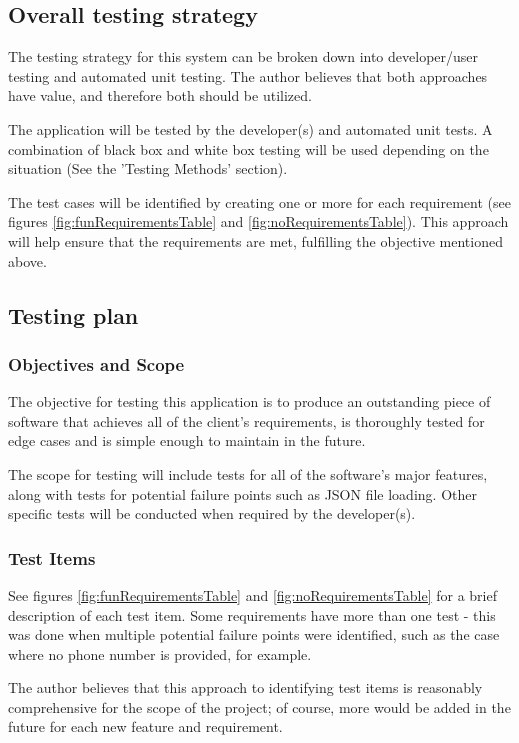 \documentclass[a4paper]{article}
\begin{document}
\subsection{Overall testing strategy}
The testing strategy for this system can be broken down into developer/user testing and automated unit testing. The author believes that both approaches have value, and therefore both should be utilized.

The application will be tested by the developer(s) and automated unit tests. A combination of black box and white box testing will be used depending on the situation (See the 'Testing Methods' section).

The test cases will be identified by creating one or more for each requirement (see figures \ref{fig:funRequirementsTable} and \ref{fig:noRequirementsTable}). This approach will help ensure that the requirements are met, fulfilling the objective mentioned above.

\subsection{Testing plan}

\subsubsection{Objectives and Scope}
The objective for testing this application is to produce an outstanding piece of software that achieves all of the client's requirements, is thoroughly tested for edge cases and is simple enough to maintain in the future.

The scope for testing will include tests for all of the software's major features, along with tests for potential failure points such as JSON file loading. Other specific tests will be conducted when required by the developer(s).

\subsubsection{Test Items}
See figures \ref{fig:funRequirementsTable} and \ref{fig:noRequirementsTable} for a brief description of each test item. Some requirements have more than one test - this was done when multiple potential failure points were identified, such as the case where no phone number is provided, for example.

The author believes that this approach to identifying test items is reasonably comprehensive for the scope of the project; of course, more would be added in the future for each new feature and requirement.
\end{document}
